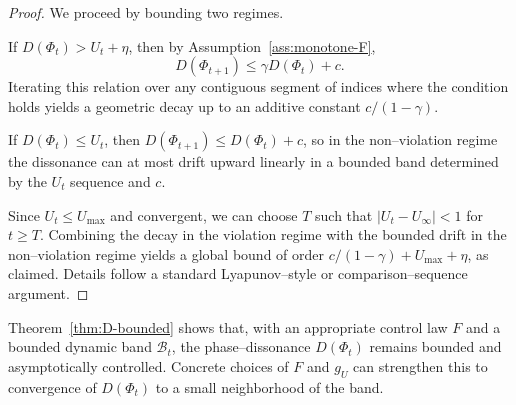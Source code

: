 \documentclass[11pt]{article}
\begin{document}
\begin{proof}
We proceed by bounding two regimes.

If $D(\Phi_t) > U_t + \eta$, then by Assumption~\ref{ass:monotone-F},
\[
  D(\Phi_{t+1}) \le \gamma D(\Phi_t) + c.
\]
Iterating this relation over any contiguous segment of indices where the condition holds yields a geometric decay up to an additive constant $c/(1-\gamma)$.

If $D(\Phi_t) \le U_t$, then $D(\Phi_{t+1}) \le D(\Phi_t) + c$, so in the non--violation regime the dissonance can at most drift upward linearly in a bounded band determined by the $U_t$ sequence and $c$.

Since $U_t \le U_{\max}$ and convergent, we can choose $T$ such that $|U_t - U_\infty| < 1$ for $t \ge T$. Combining the decay in the violation regime with the bounded drift in the non--violation regime yields a global bound of order $c/(1-\gamma) + U_{\max} + \eta$, as claimed. Details follow a standard Lyapunov--style or comparison--sequence argument.
\end{proof}

Theorem~\ref{thm:D-bounded} shows that, with an appropriate control law $F$ and a bounded dynamic band $\mathcal{B}_t$, the phase--dissonance $D(\Phi_t)$ remains bounded and asymptotically controlled. Concrete choices of $F$ and $g_U$ can strengthen this to convergence of $D(\Phi_t)$ to a small neighborhood of the band.

\nocite{*}


\end{document}

